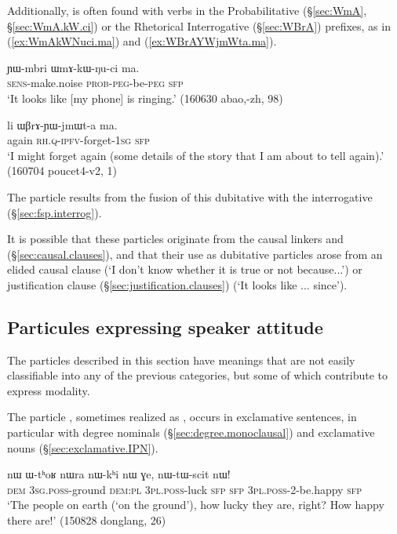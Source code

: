 Additionally,  is often found with verbs in the Probabilitative (§\ref{sec:WmA}, §\ref{sec:WmA.kW.ci})  or the Rhetorical Interrogative (§\ref{sec:WBrA}) prefixes, as in (\ref{ex:WmAkWNuci.ma}) and (\ref{ex:WBrAYWjmWta.ma}).

\begin{exe} 
\ex \label{ex:WmAkWNuci.ma}
\gll ɲɯ-mbri ɯmɤ-kɯ-ŋu-ci ma. \\
\textsc{sens}-make.noise \textsc{prob}-\textsc{peg}-be-\textsc{peg} \textsc{sfp} \\
\glt `It looks like [my phone] is ringing.' (160630 abao,-zh, 98)
 \end{exe} 

\begin{exe} 
\ex \label{ex:WBrAYWjmWta.ma}
\gll li ɯβrɤ-ɲɯ-jmɯt-a ma. \\
again \textsc{rh}.\textsc{q}-\textsc{ipfv}-forget-\textsc{1sg} \textsc{sfp} \\
\glt `I might forget again (some details of the story that I am about to tell again).' (160704 poucet4-v2, 1)
\end{exe} 

The particle  results from the fusion of this dubitative  with the interrogative  (§\ref{sec:fsp.interrog}).

It is possible that these particles originate from the causal linkers  and  (§\ref{sec:causal.clauses}), and that their use as dubitative particles arose from an elided causal clause (`I don't know whether it is true or not because...') or justification clause (§\ref{sec:justification.clauses}) (`It looks like ... since').

\subsection{Particules expressing speaker attitude} \label{sec:fsp.attitude}
The particles described in this section have meanings that are not easily classifiable into any of the previous categories, but some of which contribute to express modality.
 
The particle , sometimes realized as , occurs in exclamative sentences, in particular with degree nominals (§\ref{sec:degree.monoclausal}) and exclamative nouns (§\ref{sec:exclamative.IPN}).

\begin{exe} 
\ex \label{ex:nWtWscit.nW}
\gll  nɯ ɯ-tʰoʁ nɯra nɯ-kʰi nɯ ɣe, nɯ-tɯ-scit nɯ! \\
\textsc{dem} \textsc{3sg}.\textsc{poss}-ground \textsc{dem}:\textsc{pl} \textsc{3pl}.\textsc{poss}-luck \textsc{sfp} \textsc{sfp}  \textsc{3pl}.\textsc{poss}-2-be.happy \textsc{sfp} \\
\glt `The people on earth (`on the ground'), how lucky they are, right? How happy there are!' (150828 donglang, 26)
\end{exe} 

